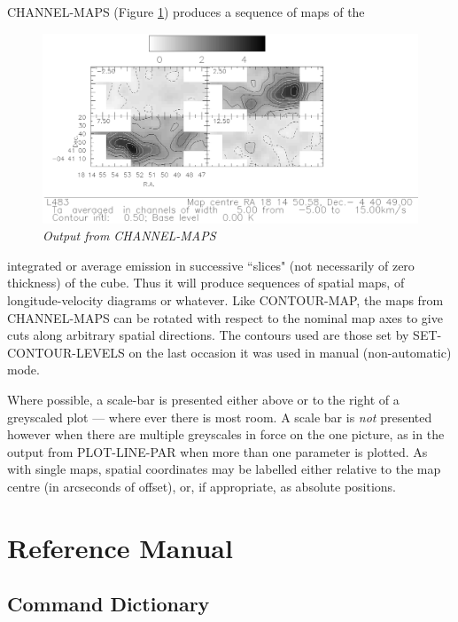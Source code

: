 \documentclass[11pt,twoside]{report}
\begin{document}
CHANNEL-MAPS (Figure \ref{CHANMAP}) produces a sequence of maps of the
\begin{figure}[htbp]
\begin{center}
\includegraphics[scale=0.8]{chann-map.ps}
\protect\parbox{5.5in}
{\caption[CHANMAP]
{\sl
Output from CHANNEL-MAPS
\label{CHANMAP}
}
}
\end{center}
\end{figure}
integrated or average emission in successive ``slices" (not necessarily of zero
thickness) of the cube. Thus it will produce sequences of spatial maps, of
longitude-velocity diagrams  or whatever.
Like CONTOUR-MAP, the maps from CHANNEL-MAPS can be rotated with respect to the
nominal map axes to give cuts along arbitrary spatial directions. The contours
used are those set by SET-CONTOUR-LEVELS on the last occasion it was used in
manual (\ie non-automatic) mode. 

Where possible, a scale-bar is presented either 
above or to the right of a greyscaled plot --- where ever there is most room.
A scale bar is {\em not} presented however when there are multiple greyscales
in force on the one picture, as in the output from PLOT-LINE-PAR when more
than one parameter is plotted.
As with single maps, spatial coordinates may be labelled either relative to
the map centre (in arcseconds of offset), or, if appropriate, as absolute
positions.

\newpage
\part{Reference Manual}
\chapter{Command Dictionary}
\end{document}
